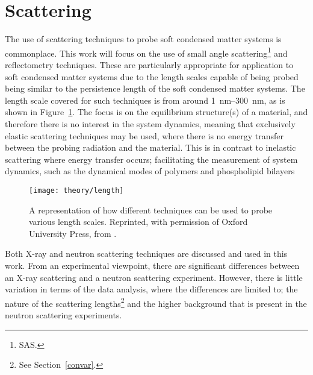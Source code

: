 \section{Scattering}
\label{sec:scattering}
The use of scattering techniques to probe soft condensed matter systems is commonplace.
This work will focus on the use of small angle scattering\footnote{SAS.} and reflectometry techniques.
These are particularly appropriate for application to soft condensed matter systems due to the length scales capable of being probed being similar to the persistence length of the soft condensed matter systems.
The length scale covered for such techniques is from around \SIrange{1}{300}{\nano\metre}, as is shown in Figure~\ref{fig:lengths}.
The focus is on the equilibrium structure(s) of a material, and therefore there is no interest in the system dynamics, meaning that exclusively elastic scattering techniques may be used, where there is no energy transfer between the probing radiation and the material.
This is in contrast to inelastic scattering where energy transfer occurs; facilitating the measurement of system dynamics, such as the dynamical modes of polymers and phospholipid bilayers\autocite{garcia_sakai_quasielastic_2009, farago_recent_2009}
%
\begin{figure}[t]
    \forceversofloat
    \centering
    \texttt{[image: theory/length]}
    \caption{A representation of how different techniques can be used to probe various length scales. Reprinted, with permission of Oxford University Press, from \cite{sivia_elementary_2011}.}
    \label{fig:lengths}
\end{figure}
%

Both X-ray and neutron scattering techniques are discussed and used in this work.
From an experimental viewpoint, there are significant differences between an X-ray scattering and a neutron scattering experiment.
However, there is little variation in terms of the data analysis, where the differences are limited to; the nature of the scattering lengths\footnote{See Section~\ref{convar}.} and the higher background that is present in the neutron scattering experiments.

